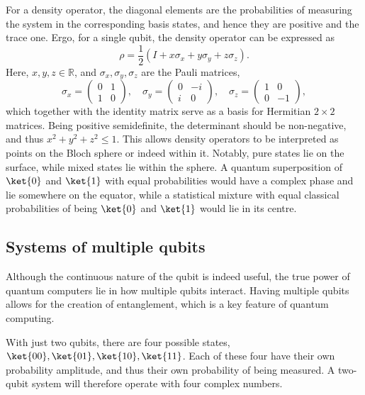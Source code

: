 For a density operator, the diagonal elements are the probabilities of measuring the system in the corresponding basis states, and hence they are positive and the trace one.
Ergo, for a single qubit, the density operator can be expressed as
\begin{equation}
    \rho = \frac{1}{2} \left(I + x \sigma_x + y \sigma_y + z \sigma_z\right).
\end{equation}
Here, $x, y, z \in \mathbb{R}$, and $\sigma_x, \sigma_y, \sigma_z$ are the Pauli matrices,
\begin{equation}
    \sigma_x = \begin{pmatrix} 0 & 1 \\ 1 & 0 \end{pmatrix}, \quad
    \sigma_y = \begin{pmatrix} 0 & -i \\ i & 0 \end{pmatrix}, \quad
    \sigma_z = \begin{pmatrix} 1 & 0 \\ 0 & -1 \end{pmatrix},
    \label{eq:pauli}
\end{equation}
which together with the identity matrix serve as a basis for Hermitian $2\times 2$ matrices.
Being positive semidefinite, the determinant should be non-negative, and thus $x^2 + y^2 + z^2 \leq 1$.
This allows density operators to be interpreted as points on the Bloch sphere or indeed within it.
Notably, pure states lie on the surface, while mixed states lie within the sphere.
A quantum superposition of $\ket{0}$ and $\ket{1}$ with equal probabilities would have a complex phase and lie somewhere on the equator, while a statistical mixture with equal classical probabilities of being $\ket{0}$ and $\ket{1}$ would lie in its centre.

\subsection{Systems of multiple qubits}
Although the continuous nature of the qubit is indeed useful, the true power of quantum computers lie in how multiple qubits interact.
Having multiple qubits allows for the creation of entanglement, which is a key feature of quantum computing.

With just two qubits, there are four possible states, $\ket{00}, \ket{01}, \ket{10}, \ket{11}$.
Each of these four have their own probability amplitude, and thus their own probability of being measured.
A two-qubit system will therefore operate with four complex numbers.

